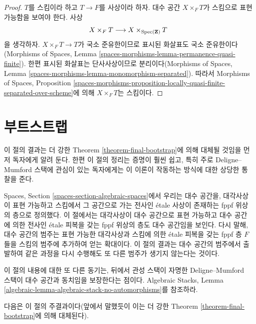 \begin{proof}
$T$를 스킴이라 하고 $T \to F$를 사상이라 하자. 대수 공간
$X \times_F T$가 스킴으로 표현 가능함을 보여야 한다. 사상
$$
X \times_F T  \longrightarrow X \times_{\mathop{\mathrm{Spec}}(\mathbf{Z})} T
$$
을 생각하자. $X \times_F T \to T$가 국소 준유한이므로 표시된 화살표도
국소 준유한이다(Morphisms of Spaces, Lemma
\ref{spaces-morphisms-lemma-permanence-quasi-finite}). 한편 표시된 화살표는
단사사상이므로 분리이다(Morphisms of Spaces, Lemma
\ref{spaces-morphisms-lemma-monomorphism-separated}). 따라서 Morphisms of
Spaces, Proposition
\ref{spaces-morphisms-proposition-locally-quasi-finite-separated-over-scheme}에
의해 $X \times_F T$는 스킴이다.
\end{proof}


\section{부트스트랩}
\label{section-bootstrap}

\noindent
이 절의 결과는 더 강한 Theorem \ref{theorem-final-bootstrap}에 의해
대체될 것임을 먼저 독자에게 알려 둔다. 한편 이 절의 정리는 증명이
훨씬 쉽고, 특히 주로 Deligne--Mumford 스택에 관심이 있는 독자에게는
이 이론이 작동하는 방식에 대한 상당한 통찰을 준다.

\medskip\noindent
Spaces, Section \ref{spaces-section-algebraic-spaces}에서 우리는 대수
공간을, 대각사상이 표현 가능하고 스킴에서 그 공간으로 가는 전사인
\'etale 사상이 존재하는 fppf 위상의 층으로 정의했다. 이 절에서는
대각사상이 대수 공간으로 표현 가능하고 대수 공간에 의한 전사인
\'etale 피복을 갖는 fppf 위상의 층도 대수 공간임을 보인다.
다시 말해, 대수 공간의 범주는 표현 가능한 대각사상과 스킴에 의한
\'etale 피복을 갖는 fppf 층 $F$들을 스킴의 범주에 추가하여 얻는
확대이다. 이 절의 결과는 대수 공간의 범주에서 출발하여 같은 과정을
다시 수행해도 또 다른 범주가 생기지 않는다는 것이다.

\medskip\noindent
이 절의 내용에 대한 또 다른 동기는, 뒤에서 관성 스택이 자명한
Deligne--Mumford 스택이 대수 공간과 동치임을 보장한다는 점이다.
Algebraic Stacks, Lemma
\ref{algebraic-lemma-algebraic-stack-no-automorphisms}를 참조하라.

\medskip\noindent
다음은 이 절의 주결과이다(앞에서 말했듯이 이는 더 강한
Theorem \ref{theorem-final-bootstrap}에 의해 대체된다).


